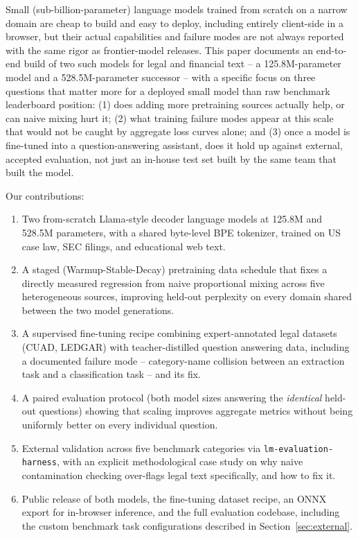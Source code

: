 \documentclass[11pt]{article}
\begin{document}
Small (sub-billion-parameter) language models trained from scratch on a
narrow domain are cheap to build and easy to deploy, including entirely
client-side in a browser, but their actual capabilities and failure modes
are not always reported with the same rigor as frontier-model releases.
This paper documents an end-to-end build of two such models for legal and
financial text -- a 125.8M-parameter model and a 528.5M-parameter successor
-- with a specific focus on three questions that matter more for a
deployed small model than raw benchmark leaderboard position: (1) does
adding more pretraining sources actually help, or can naive mixing hurt
it; (2) what training failure modes appear at this scale that would not
be caught by aggregate loss curves alone; and (3) once a model is
fine-tuned into a question-answering assistant, does it hold up against
external, accepted evaluation, not just an in-house test set built by the
same team that built the model.

Our contributions:
\begin{enumerate}[nosep]
  \item Two from-scratch Llama-style decoder language models
    \citep{touvron2023llama} at 125.8M and 528.5M parameters, with a
    shared byte-level BPE tokenizer, trained on US case law, SEC filings,
    and educational web text.
  \item A staged (Warmup-Stable-Decay) pretraining data schedule that
    fixes a directly measured regression from naive proportional mixing
    across five heterogeneous sources, improving held-out perplexity on
    every domain shared between the two model generations.
  \item A supervised fine-tuning recipe combining expert-annotated legal
    datasets (CUAD, LEDGAR) with teacher-distilled question answering
    data, including a documented failure mode -- category-name collision
    between an extraction task and a classification task -- and its fix.
  \item A paired evaluation protocol (both model sizes answering the
    \emph{identical} held-out questions) showing that scaling improves
    aggregate metrics without being uniformly better on every individual
    question.
  \item External validation across five benchmark categories via
    \texttt{lm-evaluation-harness}, with an explicit methodological case
    study on why naive contamination checking over-flags legal text
    specifically, and how to fix it.
  \item Public release of both models, the fine-tuning dataset recipe, an
    ONNX export for in-browser inference, and the full evaluation
    codebase, including the custom benchmark task configurations
    described in Section~\ref{sec:external}.
\end{enumerate}
\end{document}
